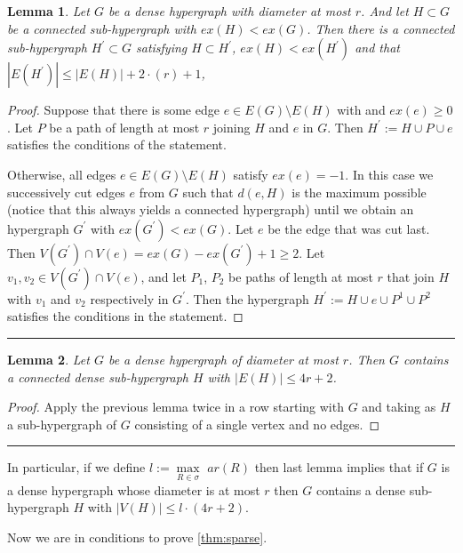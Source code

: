 \documentclass[12pt,notitlepage,a4paper]{article}
\newtheorem{lemma}{Lemma}[section]
\theoremstyle{definition}
\newcommand{\sep}{\noindent\rule{2cm}{0.4pt}}
\begin{document}
\begin{lemma}
	Let $G$ be a
	dense hypergraph with diameter at most $r$.
	And let $H\subset G$ be a connected 
	sub-hypergraph with $ex(H)<ex(G)$. Then
	there is a connected
	sub-hypergraph $H^\prime \subset G$
	satisfying $H\subset H^\prime$,
	$ex(H)<ex(H^\prime)$ and that 
	$|E(H^\prime)|\leq |E(H)|+2\cdot(r) + 1$, 
\end{lemma}
\begin{proof}
	Suppose that there is some edge $e\in E(G)\setminus E(H)$ with
	and $ex(e)\geq 0$. Let $P$ be a path
	of length at most $r$ joining $H$ and $e$ in $G$. 
	Then $H^\prime:=H\cup P \cup e$ satisfies the conditions of 
	the statement. \par
	Otherwise, all edges $e\in E(G)\setminus E(H)$ 
	satisfy $ex(e)=-1$. In this case we successively cut
	edges $e$ from $G$ such that $d(e, H)$ is the maximum possible
	(notice that this always yields a connected hypergraph)
	until we obtain an hypergraph $G^\prime$ with $ex(G^\prime)<ex(G)$.
	Let $e$ be the edge that was cut last. Then $V(G^\prime)\cap V(e)=
	ex(G)-ex(G^\prime)+1 \geq 2$. Let $v_1, v_2\in V(G^\prime)\cap V(e)$,
	and let $P_1$, $P_2$ be paths of length at most $r$ that join $H$
	with $v_1$ and $v_2$ respectively in $G^\prime$. Then the hypergraph
	$H^\prime:=H\cup e \cup P^1 \cup P^2$ satisfies the conditions 
	in the statement. 
\end{proof}
\sep
\begin{lemma}
	Let $G$ be a
	dense hypergraph of diameter at most 
	$r$. Then $G$ contains a connected 
	dense sub-hypergraph $H$ 
	with $|E(H)|\leq 4r+2$. 
\end{lemma}
\begin{proof}
	Apply the previous lemma twice in a row starting with $G$ and taking
	as $H$ a sub-hypergraph of $G$ consisting of a single vertex and 
	no edges. 
\end{proof}
\sep

In particular, if we define $l:=\max\limits_{R\in \sigma} \,\, ar(R)$
then last lemma implies that if $G$ is a dense hypergraph whose
diameter is at most $r$ then $G$ contains a dense sub-hypergraph
$H$ with $|V(H)|\leq l\cdot (4r+2)$.\par

Now we are in conditions to prove \cref{thm:sparse}.
\end{document}

